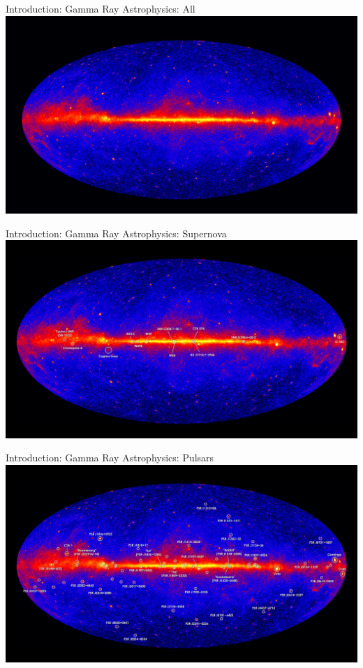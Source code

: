 \documentclass{beamer}
\begin{document}
\begin{frame}{Introduction: Gamma Ray Astrophysics: All}
\includegraphics[width=\textwidth]{figures/all-1920.jpg}
\end{frame}

\begin{frame}{Introduction: Gamma Ray Astrophysics: Supernova}
\includegraphics[width=\textwidth]{figures/superNova-1920.jpg}
\end{frame}

\begin{frame}{Introduction: Gamma Ray Astrophysics: Pulsars}
\includegraphics[width=\textwidth]{figures/pulsars-1920.jpg}
\end{frame}
\end{document}
